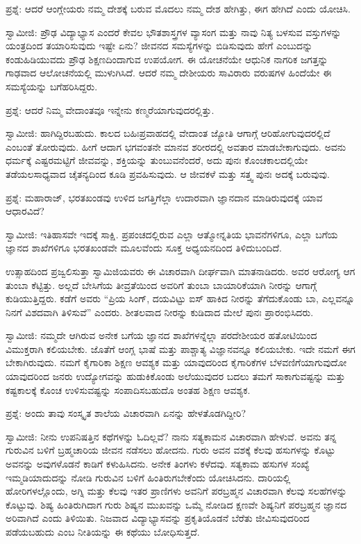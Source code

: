 ಪ್ರಶ್ನೆ: ಆದರೆ ಆಂಗ್ಲೇಯರು ನಮ್ಮ ದೇಶಕ್ಕೆ ಬರುವ ಮೊದಲು ನಮ್ಮ ದೇಶ ಹೇಗಿತ್ತು, ಈಗ ಹೇಗಿದೆ ಎಂದು ಯೋಚಿಸಿ.

ಸ್ವಾಮೀಜಿ: ಪ್ರೌಢ ವಿದ್ಯಾಭ್ಯಾಸ ಎಂದರೆ ಕೇವಲ ಭೌತಶಾಸ್ತ್ರಗಳ ವ್ಯಾಸಂಗ ಮತ್ತು ನಾವು ನಿತ್ಯ ಬಳಸುವ ವಸ್ತುಗಳನ್ನು ಯಂತ್ರದಿಂದ ತಯಾರಿಸುವುದು ಇಷ್ಟೇ ಏನು? ಜೀವನದ ಸಮಸ್ಯೆಗಳನ್ನು ಬಿಡಿಸುವುದು ಹೇಗೆ ಎಂಬುದನ್ನು ಕಂಡುಹಿಡಿಯುವದು ಪ್ರೌಢ ಶಿಕ್ಷಣದಿಂದಾಗುವ ಉಪಯೋಗ. ಈ ಯೋಚನೆಯೇ ಆಧುನಿಕ ನಾಗರಿಕ ಜಗತ್ತನ್ನು ಗಾಢವಾದ ಆಲೋಚನೆಯಲ್ಲಿ ಮುಳುಗಿಸಿದೆ. ಆದರೆ ನಮ್ಮ ದೇಶೀಯರು ಸಾವಿರಾರು ವರುಷಗಳ ಹಿಂದೆಯೇ ಈ ಸಮಸ್ಯೆಯನ್ನು ಬಗೆಹರಿಸಿದ್ದರು.

ಪ್ರಶ್ನೆ: ಆದರೆ ನಿಮ್ಮ ವೇದಾಂತವೂ ಇನ್ನೇನು ಕಣ್ಮರೆಯಾಗುವುದರಲ್ಲಿತ್ತು.

ಸ್ವಾಮೀಜಿ: ಹಾಗಿದ್ದಿರಬಹುದು. ಕಾಲದ ಬಹಿಃಪ್ರವಾಹದಲ್ಲಿ ವೇದಾಂತ ಜ್ಯೋತಿ ಆಗಾಗ್ಗೆ ಆರಿಹೋಗುವುದರಲ್ಲಿದೆ ಎಂಬಂತೆ ತೋರುವುದು. ಹೀಗೆ ಆದಾಗ ಭಗವಂತನೇ ಮಾನವ ಶರೀರದಲ್ಲಿ ಅವತಾರ ಮಾಡಬೇಕಾಗುವುದು. ಅವನು ಧರ್ಮಕ್ಕೆ ಎಷ್ಟರಮಟ್ಟಿಗೆ ಜೀವವನ್ನು, ಶಕ್ತಿಯನ್ನು ತುಂಬುವನೆಂದರೆ, ಅದು ಪುನಃ ಕೊಂಚಕಾಲದಲ್ಲಿಯೇ ತಡೆಯಲಸಾಧ್ಯವಾದ ಚೈತನ್ಯದಿಂದ ಕೂಡಿ ಪ್ರವಹಿಸುವುದು. ಆ ಜೀವಕಳೆ ಮತ್ತು ಸತ್ತ್ವ ಪುನಃ ಅದಕ್ಕೆ ಬರುವುವು.

ಪ್ರಶ್ನೆ: ಮಹಾರಾಜ್, ಭರತಖಂಡವು ಉಳಿದ ಜಗತ್ತಿಗೆಲ್ಲಾ ಉದಾರವಾಗಿ ಜ್ಞಾನದಾನ ಮಾಡಿರುವುದಕ್ಕೆ ಯಾವ ಆಧಾರವಿದೆ?

ಸ್ವಾಮೀಜಿ: ಇತಿಹಾಸವೇ ಇದಕ್ಕೆ ಸಾಕ್ಷಿ. ಪ್ರಪಂಚದಲ್ಲಿರುವ ಎಲ್ಲಾ ಆತ್ಮೋನ್ನತಿಯ ಭಾವನೆಗಳಿಗೂ, ಎಲ್ಲಾ ಬಗೆಯ ಜ್ಞಾನದ ಶಾಖೆಗಳಿಗೂ ಭರತಖಂಡವೇ ಮೂಲವೆಂದು ಸೂಕ್ತ ಅಧ್ಯಯನದಿಂದ ತಿಳಿದುಬಂದಿದೆ.

ಉತ್ಸಾಹದಿಂದ ಪ್ರಜ್ವಲಿಸುತ್ತಾ ಸ್ವಾಮಿಜಿಯವರು ಈ ವಿಚಾರವಾಗಿ ದೀರ್ಘವಾಗಿ ಮಾತನಾಡಿದರು. ಅವರ ಆರೋಗ್ಯ ಆಗ ತುಂಬಾ ಕೆಟ್ಟಿತ್ತು. ಅಲ್ಲದೆ ಬೇಸಿಗೆಯ ತೀವ್ರತೆಯಿಂದ ಅವರಿಗೆ ತುಂಬಾ ಬಾಯಾರಿಕೆಯಾಗಿ ನೀರನ್ನು ಆಗಾಗ್ಗೆ ಕುಡಿಯುತ್ತಿದ್ದರು. ಕಡೆಗೆ ಅವರು “ಪ್ರಿಯ ಸಿಂಗ್, ದಯವಿಟ್ಟು ಐಸ್ ಹಾಕಿದ ನೀರನ್ನು ತೆಗೆದುಕೊಂಡು ಬಾ, ಎಲ್ಲವನ್ನೂ ನಿನಗೆ ವಿಶದವಾಗಿ ತಿಳಿಸುವೆ” ಎಂದರು. ಶೀತಲವಾದ ನೀರನ್ನು ಕುಡಿದಾದ ಮೇಲೆ ಪುನಃ ಪ್ರಾರಂಭಿಸಿದರು.

ಸ್ವಾಮೀಜಿ: ನಮ್ಮದೇ ಆಗಿರುವ ಅನೇಕ ಬಗೆಯ ಜ್ಞಾನದ ಶಾಖೆಗಳನ್ನೆಲ್ಲಾ ಪರದೇಶೀಯರ ಹತೋಟಿಯಿಂದ ವಿಮುಕ್ತರಾಗಿ ಕಲಿಯಬೇಕು. ಜೊತೆಗೆ ಆಂಗ್ಲ ಭಾಷೆ ಮತ್ತು ಪಾಶ್ಚಾತ್ಯ ವಿಜ್ಞಾನವನ್ನೂ ಕಲಿಯಬೇಕು. ಇದೇ ನಮಗೆ ಈಗ ಬೇಕಾಗಿರುವುದು. ನಮಗೆ ಕೈಗಾರಿಕಾ ಶಿಕ್ಷಣ ಆವಶ್ಯಕ ಮತ್ತು ಯಾವುದರಿಂದ ಕೈಗಾರಿಕೆಗಳ ಬೆಳವಣಿಗೆಯಾಗುವುದೋ ಯಾವುದರಿಂದ ಜನರು ಉದ್ಯೋಗವನ್ನು ಹುಡುಕಿಕೊಂಡು ಅಲೆಯುವುದರ ಬದಲು ತಮಗೆ ಸಾಕಾಗುವಷ್ಟನ್ನು ಮತ್ತು ಕಷ್ಟಕಾಲಕ್ಕೆ ಕೊಂಚ ಉಳಿಸುವಷ್ಟನ್ನು ಸಂಪಾದಿಸಬಹುದೊ ಅಂತಹ ಶಿಕ್ಷಣ ಆವಶ್ಯಕ.

ಪ್ರಶ್ನೆ: ಅಂದು ತಾವು ಸಂಸ್ಕೃತ ಶಾಲೆಯ ವಿಚಾರವಾಗಿ ಏನನ್ನು ಹೇಳತೊಡಗಿದ್ದೀರಿ?

ಸ್ವಾಮೀಜಿ: ನೀನು ಉಪನಿಷತ್ತಿನ ಕಥೆಗಳನ್ನು ಓದಿಲ್ಲವೆ? ನಾನು ಸತ್ಯಕಾಮನ ವಿಚಾರವಾಗಿ ಹೇಳುವೆ. ಅವನು ತನ್ನ ಗುರುವಿನ ಬಳಿಗೆ ಬ್ರಹ್ಮಚಾರಿಯ ಜೀವನ ನಡೆಸಲು ಹೋದನು. ಗುರು ಅವನ ವಶಕ್ಕೆ ಕೆಲವು ಹಸುಗಳನ್ನು ಕೊಟ್ಟು ಅವನನ್ನು ಅವುಗಳೊಡನೆ ಕಾಡಿಗೆ ಕಳುಹಿಸಿದನು. ಅನೇಕ ತಿಂಗಳು ಕಳೆದವು. ಸತ್ಯಕಾಮ ಹಸುಗಳ ಸಂಖ್ಯೆ ಇಮ್ಮಡಿಯಾದುದನ್ನು ನೋಡಿ ಗುರುವಿನ ಬಳಿಗೆ ಹಿಂತಿರುಗಬೇಕೆಂದು ಯೋಚಿಸಿದನು. ದಾರಿಯಲ್ಲಿ ಹೋರಿಗಳಲ್ಲೊಂದು, ಅಗ್ನಿ ಮತ್ತು ಕೆಲವು ಇತರ ಪ್ರಾಣಿಗಳು ಅವನಿಗೆ ಪರಬ್ರಹ್ಮನ ವಿಚಾರವಾಗಿ ಕೆಲವು ಸಲಹೆಗಳನ್ನು ಕೊಟ್ಟುವು. ಶಿಷ್ಯ ಹಿಂತಿರುಗಿದಾಗ ಗುರು ಶಿಷ್ಯನ ಮುಖವನ್ನು ಒಮ್ಮೆ ನೋಡಿದ ಕ್ಷಣವೇ ಶಿಷ್ಯನಿಗೆ ಪರಬ್ರಹ್ಮನ ಜ್ಞಾನದ ಅರಿವಾಗಿದೆ ಎಂದು ತಿಳಿಯಿತು. ನಿಜವಾದ ವಿದ್ಯಾಭ್ಯಾಸವನ್ನು ಪ್ರಕೃತಿಯೊಡನೆ ಬೆರೆತು ಜೀವಿಸುವುದರಿಂದ ಪಡೆಯಬಹುದು ಎಂಬ ನೀತಿಯನ್ನು ಈ ಕಥೆಯು ಬೋಧಿಸುತ್ತದೆ.

